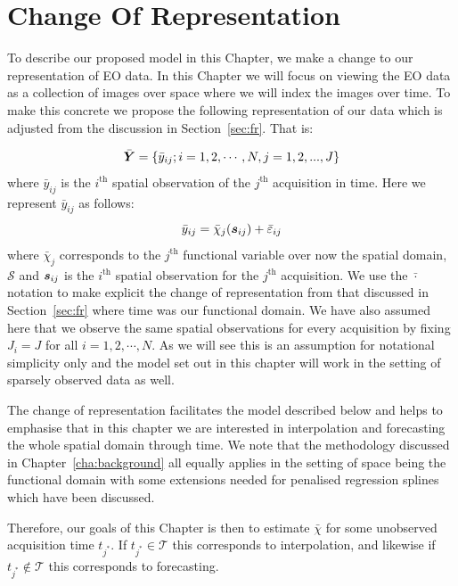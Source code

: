 \section{Change Of Representation \label{sec:representation}}
To describe our proposed model in this Chapter, we make a change to our representation of EO data.
In this Chapter we will focus on viewing the EO data as a collection of images over space where we will index the images over time.
To make this concrete we propose the following representation of our data which is adjusted from the discussion in Section~\ref{sec:fr}.
That is: 

\begin{equation}
	\bar{\bm{{Y}}} = \{ \bar{y}_{ij}; i=1, 2, \cdots, N, j = 1, 2, ... ,J\}
\end{equation}
where $\bar{y}_{ij}$ is the $i^\text{th}$ spatial observation of the $j^\text{th}$ acquisition in time.
Here we represent $\bar{y}_{ij}$ as follows:
\begin{equation}
	\bar{y}_{ij} = \bar{\chi}_j(\bm{{s}}_{ij})  + \bar{\varepsilon}_{ij}
	\label{eqn:space_obs}
\end{equation}
where $\bar{\chi}_j$ corresponds to the $j^\text{th}$  functional variable over now the spatial domain, $\mathcal{S}$ and $\bm{{s}}_{ij}$ is the $i^\text{th}$ spatial observation for the $j^\text{th}$ acquisition.
We use the $\bar{\cdot}$ notation to make explicit the change of representation from that discussed in Section~\ref{sec:fr} where time was our functional domain.
We have also assumed here that we observe the same spatial observations for every acquisition by fixing $J_i = J$ for all $i=1, 2, \cdots, N$.
As we will see this is an assumption for notational simplicity only and the model set out in this chapter will work in the setting of sparsely observed data as well. 

The change of representation facilitates the model described below and helps to emphasise that in this chapter we are interested in interpolation and forecasting the whole spatial domain through time.
We note that the methodology discussed in Chapter~\ref{cha:background} all equally applies in the setting of space being the functional domain with some extensions needed for penalised regression splines which have been discussed.

Therefore, our goals of this Chapter is then to estimate $\bar{\chi}$ for some unobserved acquisition time $t_{j^*}$.
If $t_{j^*} \in \mathcal{T}$ this corresponds to interpolation, and likewise if $t_{j^*} \not \in \mathcal{T}$ this corresponds to forecasting.

